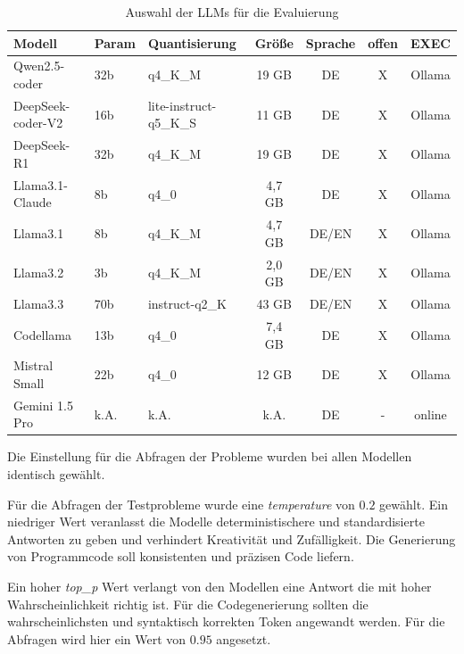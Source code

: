 \begin{table}[!ht]
	\begin{tabular}{|l|l|l|c|c|c|c|}
		\hline
		\textbf{Modell} & \textbf{Param} & \textbf{Quantisierung} & \textbf{Größe} & \textbf{Sprache} & \textbf{offen} & \textbf{EXEC} \\
		\hline
		Qwen2.5-coder     & 32b &               q4\_K\_M &  19 GB &    DE & X & Ollama \\
		DeepSeek-coder-V2 & 16b & lite-instruct-q5\_K\_S &  11 GB &    DE & X & Ollama \\
		DeepSeek-R1       & 32b &               q4\_K\_M &  19 GB &    DE & X & Ollama \\
		Llama3.1-Claude   &  8b &                  q4\_0 & 4,7 GB &    DE & X & Ollama \\
		Llama3.1          &  8b &               q4\_K\_M & 4,7 GB & DE/EN & X & Ollama \\
		Llama3.2          &  3b &               q4\_K\_M & 2,0 GB & DE/EN & X & Ollama \\
		Llama3.3          & 70b &         instruct-q2\_K &  43 GB & DE/EN & X & Ollama \\
		Codellama         & 13b &                  q4\_0 & 7,4 GB &    DE & X & Ollama \\
		Mistral Small     & 22b &                  q4\_0 &  12 GB &    DE & X & Ollama \\
		Gemini 1.5 Pro    &k.A. &                   k.A. &   k.A. &    DE & - & online \\
		\hline
		\hline
	\end{tabular}
	\caption{Auswahl der LLMs für die Evaluierung}
	\label{tab:selected_llms}
\end{table}

Die Einstellung für die Abfragen der Probleme wurden bei allen Modellen identisch gewählt.\vspace{0.2cm}

Für die Abfragen der Testprobleme wurde eine \textit{temperature} von $0.2$ gewählt. Ein niedriger Wert veranlasst die Modelle deterministischere und standardisierte Antworten zu geben und verhindert Kreativität und Zufälligkeit. Die Generierung von Programmcode soll konsistenten und präzisen Code liefern.\vspace{0.2cm}

Ein hoher \textit{top\_p} Wert verlangt von den Modellen eine Antwort die mit hoher Wahrscheinlichkeit richtig ist. Für die Codegenerierung sollten die wahrscheinlichsten und syntaktisch korrekten Token angewandt werden. Für die Abfragen wird hier ein Wert von $0.95$ angesetzt.\vspace{0.2cm}

